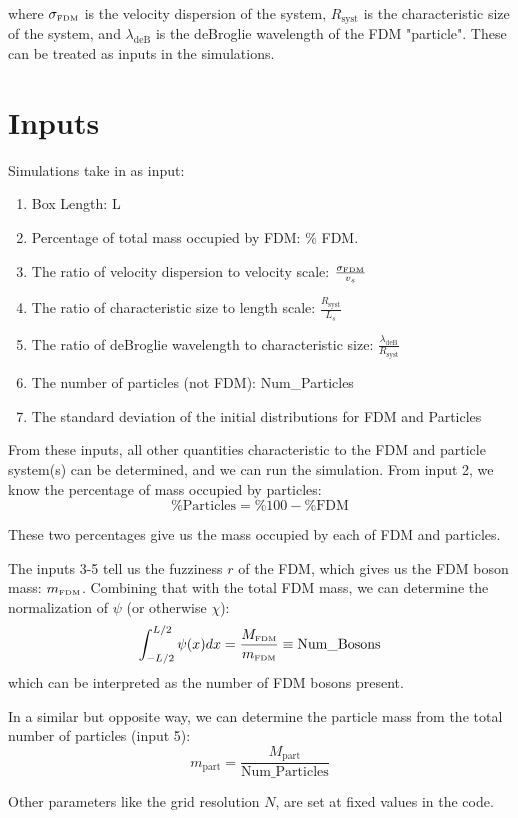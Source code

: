 \documentclass[oneside]{book}
\begin{document}
where $\sigma_\text{\tiny{FDM}}$ is the velocity dispersion of the system, $R_\text{syst}$ is the characteristic size of the system,
and $\lambda_\text{deB}$ is the deBroglie wavelength of the FDM "particle". These can be treated as inputs in the simulations.

\section{Inputs}
Simulations take in as input:
\begin{enumerate}
    \item Box Length: L
    \item Percentage of total mass occupied by FDM: \% FDM.
    \item The ratio of velocity dispersion to velocity scale: $\frac{\sigma_\text{\tiny{FDM}}}{v_s}$
    \item The ratio of characteristic size to length scale: $\frac{R_\text{syst}}{L_s}$
    \item The ratio of deBroglie wavelength to characteristic size: $\frac{\lambda_\text{deB}}{R_\text{syst}}$ 
    \item The number of particles (not FDM): Num\_Particles
    \item The standard deviation of the initial distributions for FDM and Particles
\end{enumerate}

From these inputs, all other quantities characteristic to the FDM and particle system(s) can
be determined, and we can run the simulation. From input 2, we know the percentage of mass occupied by particles:
$$\text{\% Particles} = \% 100 - \text{\% FDM}$$

These two percentages give us the mass occupied by each of FDM and particles.

The inputs 3-5 tell us the fuzziness $r$ of the FDM, which gives us the FDM boson mass: $m_\text{\tiny{FDM}}$.
Combining that with the total FDM mass, we can determine the normalization of $\psi$ (or otherwise $\chi$):
$$\int_{-L/2}^{L/2} \psi(x) dx = \frac{M_\text{\tiny{FDM}}}{m_\text{\tiny{FDM}}} \equiv \text{Num\_Bosons}$$
which can be interpreted as the number of FDM bosons present.

In a similar but opposite way, we can determine the particle mass from the total number of particles (input 5):
$$m_\text{part} = \frac{M_\text{part}}{\text{Num\_Particles}}$$

Other parameters like the grid resolution $N$, are set at fixed values in the code.
\end{document}
